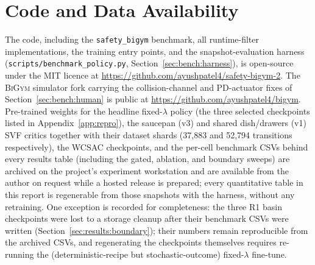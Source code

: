 \documentclass[11pt,a4paper]{report}
\newcommand{\bigym}{\textsc{BiGym}}
\newcommand{\sbigym}{\texttt{safety\_bigym}}
\begin{document}
\chapter{Code and Data Availability}
\label{app:data}

The code, including the \sbigym{} benchmark, all runtime-filter
implementations, the training entry points, and the
snapshot-evaluation harness
(\texttt{scripts/benchmark\_policy.py},
Section~\ref{sec:bench:harness}), is open-source under the MIT
licence at \url{https://github.com/ayushpatel4/safety-bigym-2}. The
\bigym{} simulator fork carrying the collision-channel and
PD-actuator fixes of Section~\ref{sec:bench:human} is public at
\url{https://github.com/ayushpatel4/bigym}. Pre-trained weights for
the headline fixed-$\lambda$ policy (the three selected checkpoints
listed in Appendix~\ref{app:repro}), the saucepan (v3) and shared
dish/drawers (v1) SVF critics together with their dataset shards
(37{,}883 and 52{,}794 transitions respectively), the WCSAC
checkpoints, and the per-cell benchmark CSVs behind every results
table (including the gated, ablation, and boundary sweeps) are
archived on the project's experiment workstation and are available
from the author on request while a hosted release is prepared; every
quantitative table in this report is regenerable from those
snapshots with the harness, without any retraining. One exception is
recorded for completeness: the three R1 basin checkpoints were lost
to a storage cleanup after their benchmark CSVs were written
(Section~\ref{sec:results:boundary}); their numbers remain
reproducible from the archived CSVs, and regenerating the
checkpoints themselves requires re-running the (deterministic-recipe
but stochastic-outcome) fixed-$\lambda$ fine-tune.


\end{document}
